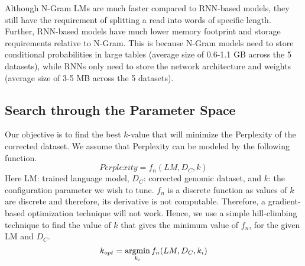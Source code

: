 Although N-Gram LMs are much faster compared to RNN-based models, they still have the requirement of splitting a read into words of specific length.
Further, RNN-based models have much lower memory footprint and storage requirements relative to N-Gram. This is because N-Gram models need to store conditional probabilities in large tables (average size of 0.6-1.1 GB across the 5 datasets), while RNNs only need to store the network architecture and  weights (average size of 3-5 MB across the 5 datasets). 

\subsection{Search through the Parameter Space}
Our objective is to find the best $k$-value that will minimize the Perplexity of the corrected dataset. We assume that Perplexity can be modeled by the following function.
\begin{equation}
Perplexity = f_{n}(LM, D_C, k)
\end{equation} 
Here LM: trained language model, $D_C$: corrected genomic dataset, and $k$: the configuration parameter we wish to tune.
$f_{n}$ is a discrete function as values of $k$ are discrete and therefore, its derivative is not computable. Therefore, a gradient-based optimization technique will not work. Hence, we use a simple hill-climbing technique to find the value of $k$ that gives the minimum value of $f_n$, for the given LM and $D_C$.
\begin{equation}
  k_{opt} = \operatorname*{argmin}_{k_i} f_{n}(LM, D_C, k_i)
\end{equation} 

